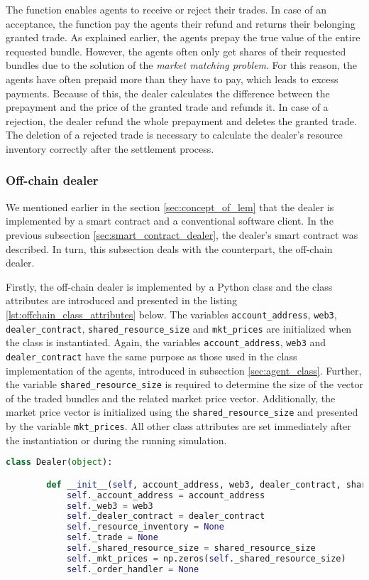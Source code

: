 The function enables agents to receive or reject their trades. 
In case of an acceptance, the function pay the agents their refund
and returns their belonging granted trade.
As explained earlier, the agents prepay the true value of the entire requested bundle.
However, the agents often only get shares of their requested bundles due to the solution of the 
\textit{market matching problem}.
For this reason, the agents have often prepaid more than they have to pay, which leads to 
excess payments. Because of this, the dealer calculates the difference between the prepayment 
and the price of the granted trade and refunds it.
In case of a rejection, the dealer refund the whole prepayment and deletes the granted trade.
The deletion of a rejected trade is necessary to calculate the dealer's resource inventory correctly
after the settlement process.


\subsubsection{Off-chain dealer}
We mentioned earlier in the section \ref{sec:concept_of_lem} that the 
dealer is implemented by a smart contract and a conventional software client.
In the previous subsection \ref{sec:smart_contract_dealer}, the 
dealer's smart contract was described. In turn, 
this subsection deals with the counterpart, the off-chain dealer. 

Firstly, the off-chain dealer is implemented by a Python class and the 
class attributes are introduced and presented in the listing \ref{lst:offchain_class_attributes} below.
The variables \verb|account_address|, \verb|web3|, 
\verb|dealer_contract|, \verb|shared_resource_size| and \verb|mkt_prices| 
are initialized when the class is instantiated.
Again, the variables \verb|account_address|, \verb|web3| and 
\verb|dealer_contract| have the same purpose as those used in the class implementation of 
the agents, introduced in subsection \ref{sec:agent_class}.
Further, the variable \verb|shared_resource_size| is required to determine the size 
of the vector of the traded bundles and the related market price vector. 
Additionally, the market price vector is initialized using the \verb|shared_resource_size|
and presented by the variable \verb|mkt_prices|.
All other class attributes are set immediately after 
the instantiation or during the running simulation.

\begin{lstlisting}[float=htbp, label=lst:offchain_class_attributes, caption=Overview of the off-chain dealer's class attributes, language=Python]
    class Dealer(object):

        def __init__(self, account_address, web3, dealer_contract, shared_resource_size):
            self._account_address = account_address
            self._web3 = web3
            self._dealer_contract = dealer_contract
            self._resource_inventory = None
            self._trade = None
            self._shared_resource_size = shared_resource_size
            self._mkt_prices = np.zeros(self._shared_resource_size)
            self._order_handler = None
\end{lstlisting}

